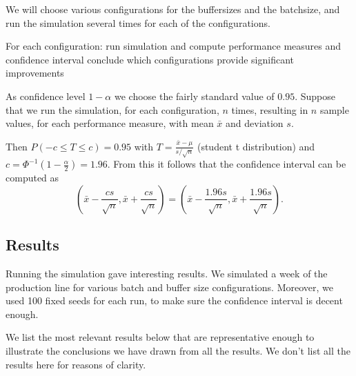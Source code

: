 \documentclass{article}
\begin{document}
We will choose various configurations for the buffersizes and the batchsize, and run the simulation several times for each of the configurations.

For each configuration:
    run simulation and compute performance measures and confidence interval
    conclude which configurations provide significant improvements


As confidence level $1 - \alpha$ we choose the fairly standard value of $0.95$.
Suppose that we run the simulation, for each configuration, $n$ times, resulting in $n$ sample values, for each performance measure, with mean $\bar{x}$ and deviation $s$.

Then $P(-c \leq T \leq c) = 0.95 $ with $T = \frac{\bar{x} - \mu}{s/\sqrt{n}}$ (student t distribution) and $c = \Phi ^{-1} (1 - \frac{\alpha}{2})= 1.96$.
From this it follows that the confidence interval can be computed as
\[ (\bar{x} - \frac{cs}{\sqrt{n}}, \bar{x} + \frac{cs}{\sqrt{n}}) =
(\bar{x} - \frac{1.96s}{\sqrt{n}}, \bar{x} + \frac{1.96s}{\sqrt{n}}). \]


\subsection{Results}
Running the simulation gave interesting results.
We simulated a week of the production line for various batch and buffer size configurations.
Moreover, we used 100 fixed seeds for each run, to make sure the confidence interval is decent enough.

We list the most relevant results below that are representative enough to illustrate the conclusions we have drawn from all the results. We don't list all the results here for reasons of clarity.
\end{document}
